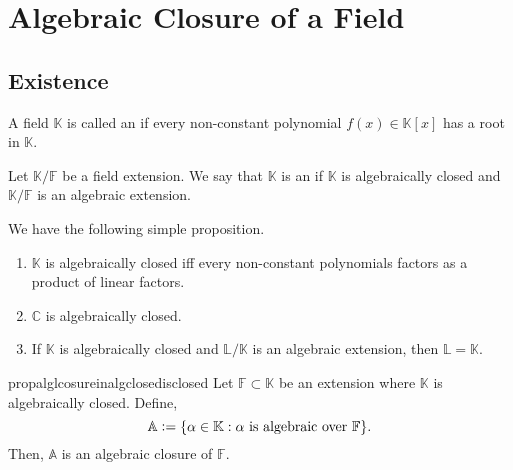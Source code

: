 \chapter{Algebraic Closure of a Field}

\section{Existence}

\begin{defn}%
    A field $\mathbb{K}$ is called an  if every non-constant polynomial $f(x) \in \mathbb{K}[x]$ has a root in $\mathbb{K}.$
\end{defn}

\begin{defn}%
    Let $\mathbb{K}/\mathbb{F}$ be a field extension. We say that $\mathbb{K}$ is an  if $\mathbb{K}$ is algebraically closed and $\mathbb{K}/\mathbb{F}$ is an algebraic extension.
\end{defn}

We have the following simple proposition.
\begin{prop}
    \phantom{hi}
    \begin{enumerate}
        \item $\mathbb{K}$ is algebraically closed iff every non-constant polynomials factors as a product of linear factors.
        \item $\mathbb{C}$ is algebraically closed.
        \item If $\mathbb{K}$ is algebraically closed and $\mathbb{L}/\mathbb{K}$ is an algebraic extension, then $\mathbb{L} = \mathbb{K}.$
    \end{enumerate}
\end{prop}

\begin{restatable}[]{prop}{alglcosureinalgclosedisclosed}
\label{prop:alglcosureinalgclosedisclosed}
    Let $\mathbb{F} \subset \mathbb{K}$ be an extension where $\mathbb{K}$ is algebraically closed. Define,
    \begin{equation*} 
        \mathbb{A} \vcentcolon= \{\alpha \in \mathbb{K} : \alpha \text{ is algebraic over }\mathbb{F}\}.
    \end{equation*}
    Then, $\mathbb{A}$ is an algebraic closure of $\mathbb{F}.$ \hfill\hyperref[prop:alglcosureinalgclosedisclosed2]{\downsym}
\end{restatable}

